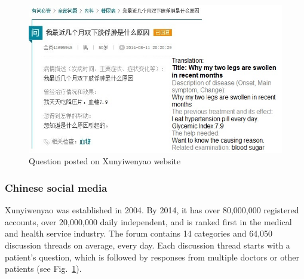 \begin{figure}\sidecaption
\centering
	\includegraphics[width=0.9\columnwidth]{Fig2.jpg}
	\caption{Question posted on Xunyiwenyao website}

	\label{fig:2}	
\end{figure}

\subsubsection{Chinese social media}
\label{subsubsec:2.2.1} 
Xunyiwenyao was established in 2004. By 2014, it has over 80,000,000 registered accounts, 
over 20,000,000 daily independent, and is ranked first in the medical and health service 
industry. The forum contains 14 categories and 64,050 discussion threads on average, 
every day. Each discussion thread starts with a patient’s question, which is followed by 
responses from multiple doctors or other patients (see Fig.~\ref{fig:2}).

